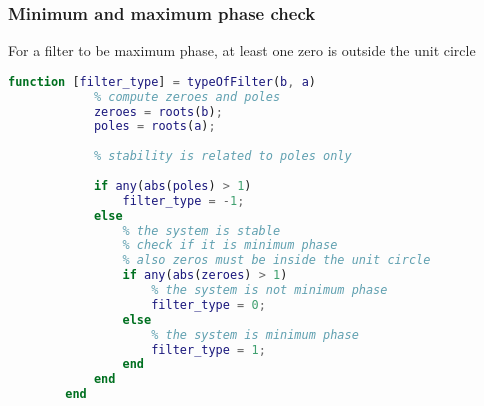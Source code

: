     \subsubsection{Minimum and maximum phase check}
    For a filter to be maximum phase, at least one zero is outside the unit circle
    \begin{lstlisting}[language=Matlab, escapeinside=`']
        function [filter_type] = typeOfFilter(b, a)
            % compute zeroes and poles
            zeroes = roots(b);
            poles = roots(a);
        
            % stability is related to poles only
        
            if any(abs(poles) > 1)
                filter_type = -1;
            else
                % the system is stable
                % check if it is minimum phase
                % also zeros must be inside the unit circle
                if any(abs(zeroes) > 1)
                    % the system is not minimum phase
                    filter_type = 0;
                else
                    % the system is minimum phase
                    filter_type = 1;
                end        
            end
        end
    \end{lstlisting}


